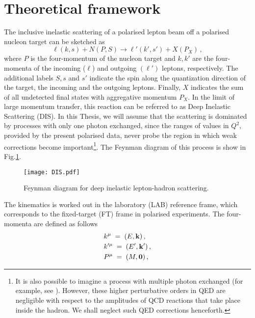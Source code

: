 \section{Theoretical framework}
The inclusive inelastic scattering of a polarised lepton beam off a polarised nucleon target can be sketched as
\begin{equation}
    \ell(k,s) + N(P, S) \longrightarrow \ell'(k',s') + X(P_X) \,,
    \label{eq:DIS}
\end{equation}
where $P$ is the four-momentum of the nucleon target and $k,k'$ are the four-momenta of the incoming ($\ell$) and outgoing $(\ell')$ leptons, respectively. The additional labels $S,s$ and $s'$ indicate the spin along the quantization direction of the target, the incoming and the outgoing leptons. Finally, $X$ indicates the sum of all undetected final states with aggregative momentum $P_X$. In the limit of large momentum transfer, this reaction can be referred to as Deep Inelastic Scattering (DIS). In this Thesis, we will assume that the scattering is dominated by processes with only one photon exchanged, since the ranges of values in $Q^2$, provided by the present polarised data, never probe the region in which weak corrections become important\footnote{It is also possible to imagine a process with multiple photon exchanged (for example, see \cite{leader_predazzi_1996}). However, these higher perturbative orders in QED are negligible with respect to the amplitudes of QCD reactions that take place inside the hadron. We shall neglect such QED corrections henceforth.}. The Feynman diagram of this process is show in Fig.\ref{fig:DIS_Feynamn}.
\begin{figure}[h]
  \centering
  \texttt{[image: DIS.pdf]} 
  \caption{Feynman diagram for deep inelastic lepton-hadron scattering.}
  \label{fig:DIS_Feynamn}
\end{figure}
The kinematics is worked out in the laboratory (LAB) reference frame, which corresponds to the fixed-target (FT) frame in polarised experiments. The four-momenta are defined as follows
\begin{equation}
    \begin{split}
        &k^{\mu} \;=\; \left(E, \vb{k} \right), \\
        &k'^{\mu} \;=\; \left(E', \vb{k'} \right), \\
        &P^{\mu} \;=\; \left(M, \vb{0} \right),
    \end{split}
\end{equation}
